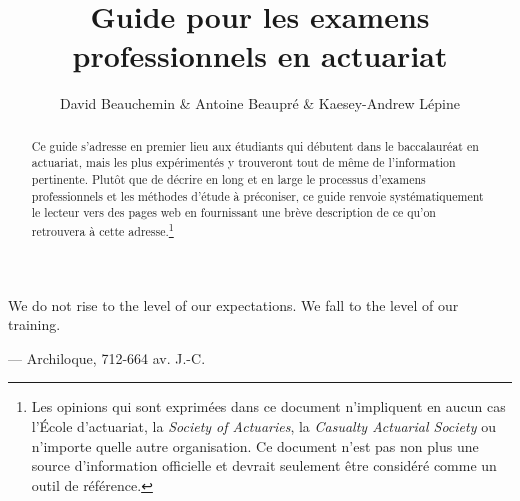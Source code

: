 \documentclass[11pt,french]{article}
\title{Guide pour les examens professionnels en actuariat}
\author{David Beauchemin \& Antoine Beaupré \& Kaesey-Andrew Lépine}
\begin{document}
\maketitle
\thispagestyle{fancy}
\begin{abstract}
Ce guide s'adresse en premier lieu aux étudiants qui débutent dans le baccalauréat en actuariat, mais les plus expérimentés y trouveront tout de même de l'information pertinente. Plutôt que de décrire en long et en large le processus d'examens professionnels et les méthodes d'étude à préconiser, ce guide renvoie systématiquement le lecteur vers des pages web en fournissant une brève description de ce qu'on retrouvera à cette adresse.\footnote{Les opinions qui sont exprimées dans ce document n'impliquent en aucun cas l'École d'actuariat, la \emph{Society of Actuaries}, la \emph{Casualty Actuarial Society} ou n'importe quelle autre organisation. Ce document n'est pas non plus une source d'information officielle et devrait seulement être considéré comme un outil de référence.}{\tiny} 
\end{abstract}

\clearpage
{}
\begin{center}
\begin{minipage}{.6\textwidth}
\epigraph{We do not rise to the level of our expectations. We fall to the level of our training.}{--- \textup{Archiloque}, 712-664 av. J.-C.}
\end{minipage}
\end{center}
\clearpage

\newpage
\tableofcontents

\newpage
{}
\setcounter{page}{1}







\end{document}
